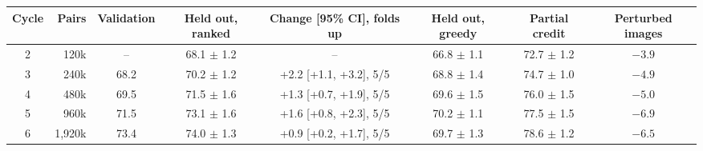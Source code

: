 \begin{tabular}{crcccccc}
\toprule
Cycle & Pairs & Validation & Held out, ranked & Change [95\% CI], folds up & Held out, greedy & Partial credit & Perturbed images \\
\midrule
2 & 120k & -- & 68.1 $\pm$ 1.2 & -- & 66.8 $\pm$ 1.1 & 72.7 $\pm$ 1.2 & $-3.9$ \\
3 & 240k & 68.2 & 70.2 $\pm$ 1.2 & +2.2 [+1.1, +3.2], 5/5 & 68.8 $\pm$ 1.4 & 74.7 $\pm$ 1.0 & $-4.9$ \\
4 & 480k & 69.5 & 71.5 $\pm$ 1.6 & +1.3 [+0.7, +1.9], 5/5 & 69.6 $\pm$ 1.5 & 76.0 $\pm$ 1.5 & $-5.0$ \\
5 & 960k & 71.5 & 73.1 $\pm$ 1.6 & +1.6 [+0.8, +2.3], 5/5 & 70.2 $\pm$ 1.1 & 77.5 $\pm$ 1.5 & $-6.9$ \\
6 & 1,920k & 73.4 & 74.0 $\pm$ 1.3 & +0.9 [+0.2, +1.7], 5/5 & 69.7 $\pm$ 1.3 & 78.6 $\pm$ 1.2 & $-6.5$ \\
\bottomrule
\end{tabular}
